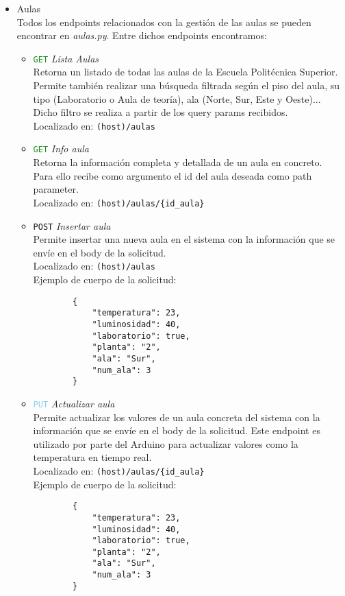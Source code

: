 \documentclass[12pt]{report}
\begin{document}
\begin{itemize}
\begin{itemize}
    \end{itemize}
    \item Aulas\\
Todos los endpoints relacionados con la gestión de las aulas se pueden encontrar en \textit{aulas.py}. Entre dichos endpoints encontramos:
\begin{itemize}
    \item \textcolor{ForestGreen}{\texttt{GET}} \textit{Lista Aulas}\\
    Retorna un listado de todas las aulas de la Escuela Politécnica Superior. Permite también realizar una búsqueda filtrada según el piso del aula, su tipo (Laboratorio o Aula de teoría), ala (Norte, Sur, Este y Oeste)... Dicho filtro se realiza a partir de los query params recibidos.\\
    Localizado en: \texttt{(host)/aulas}
    
    \item \textcolor{ForestGreen}{\texttt{GET}} \textit{Info aula}\\
    Retorna la información completa y detallada de un aula en concreto.\\
    Para ello recibe como argumento el id del aula deseada como path parameter.\\
    Localizado en: \texttt{(host)/aulas/\{id\_aula\}}
        
    \item \textcolor{YellowOrange}{\texttt{POST}} \textit{Insertar aula}\\
    Permite insertar una nueva aula en el sistema con la información que se envíe en el body de la solicitud.\\
    Localizado en: \texttt{(host)/aulas}
        \\Ejemplo de cuerpo de la solicitud:
        \begin{verbatim}
        {
            "temperatura": 23,
            "luminosidad": 40,
            "laboratorio": true,
            "planta": "2",
            "ala": "Sur",
            "num_ala": 3
        }
        \end{verbatim}
        
    \item \textcolor{SkyBlue}{\texttt{PUT}} \textit{Actualizar aula}\\
    Permite actualizar los valores de un aula concreta del sistema con la información que se envíe en el body de la solicitud. Este endpoint es utilizado por parte del Arduino para actualizar valores como la temperatura en tiempo real.\\
    Localizado en: \texttt{(host)/aulas/\{id\_aula\}}
        \\Ejemplo de cuerpo de la solicitud:
        \begin{verbatim}
        {
            "temperatura": 23,
            "luminosidad": 40,
            "laboratorio": true,
            "planta": "2",
            "ala": "Sur",
            "num_ala": 3
        }
        \end{verbatim}
        

\end{itemize}
\end{itemize}
\end{document}
